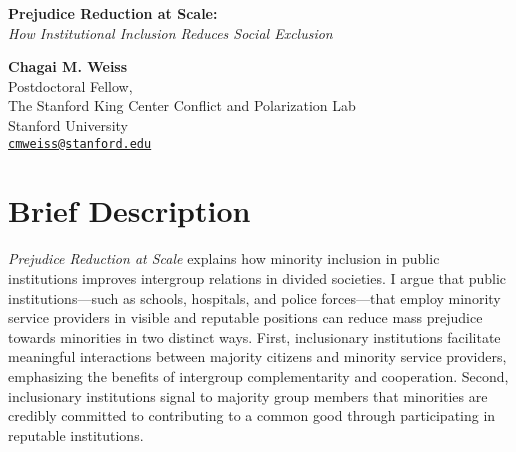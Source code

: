 \documentclass[12pt]{article}
\theoremstyle{plain}
\begin{document}





\begin{center}
\singlespace
\large{\textbf{Prejudice Reduction at Scale:}\\
\emph{How Institutional Inclusion Reduces Social Exclusion}}\\
\doublespacing

\normalsize{
\begin{singlespace}
\textbf{Chagai M. Weiss}\\
Postdoctoral Fellow, \\
The Stanford King Center Conflict and Polarization Lab\\
Stanford University\\
\href{cmweiss@stanford.edu}{\texttt{cmweiss@stanford.edu}}
\end{singlespace}}
\end{center}
\onehalfspacing



\section*{Brief Description}
\emph{Prejudice Reduction at Scale} explains how minority inclusion in public institutions improves intergroup relations in divided societies. I argue that public institutions---such as schools, hospitals, and police forces---that employ minority service providers in visible and reputable positions can reduce mass prejudice towards minorities in two distinct ways. First, inclusionary institutions facilitate meaningful interactions between majority citizens and minority service providers, emphasizing the benefits of intergroup complementarity and cooperation. Second, inclusionary institutions signal to majority group members that minorities are credibly committed to contributing to a common good through participating in reputable institutions. 
\end{document}

